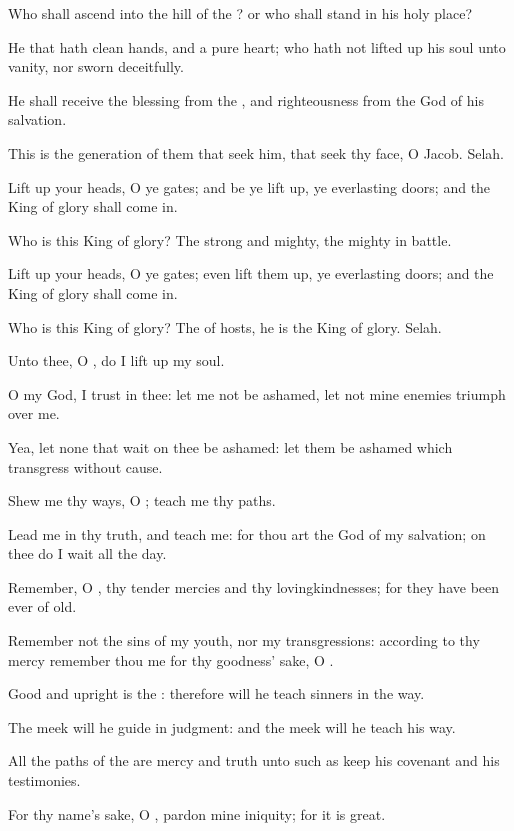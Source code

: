 \Verse Who shall ascend into the hill of the \LORD? or who shall stand in his holy place?

\Verse He that hath clean hands, and a pure heart; who hath not lifted up his soul unto vanity, nor sworn deceitfully.

\Verse He shall receive the blessing from the \LORD, and righteousness from the God of his salvation.

\Verse This is the generation of them that seek him, that seek thy face, O Jacob. Selah.

\Verse Lift up your heads, O ye gates; and be ye lift up, ye everlasting doors; and the King of glory shall come in.

\Verse Who is this King of glory? The \LORD strong and mighty, the \LORD mighty in battle.

\Verse Lift up your heads, O ye gates; even lift them up, ye everlasting doors; and the King of glory shall come in.

\Verse Who is this King of glory? The \LORD of hosts, he is the King of glory. Selah.




\Chapter
\Verse Unto thee, O \LORD, do I lift up my soul.

\Verse O my God, I trust in thee: let me not be ashamed, let not mine enemies triumph over me.

\Verse Yea, let none that wait on thee be ashamed: let them be ashamed which transgress without cause.

\Verse Shew me thy ways, O \LORD; teach me thy paths.

\Verse Lead me in thy truth, and teach me: for thou art the God of my salvation; on thee do I wait all the day.

\Verse Remember, O \LORD, thy tender mercies and thy lovingkindnesses; for they have been ever of old.

\Verse Remember not the sins of my youth, nor my transgressions: according to thy mercy remember thou me for thy goodness' sake, O \LORD.

\Verse Good and upright is the \LORD: therefore will he teach sinners in the way.

\Verse The meek will he guide in judgment: and the meek will he teach his way.

\Verse All the paths of the \LORD are mercy and truth unto such as keep his covenant and his testimonies.

\Verse For thy name's sake, O \LORD, pardon mine iniquity; for it is great.

